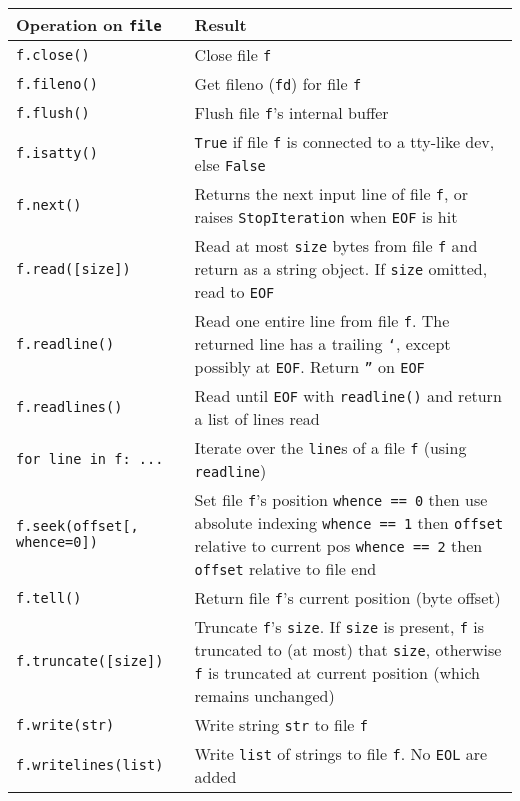 \label{tab:fichiers}
\begin{longtable}{|p{5cm}|p{10cm}|}
\hline
\bf Operation on {\tt file}	&	\bf Result \\
\hline
\hline
\tt f.close() 			& Close file {\tt f}\\
\tt f.fileno() 			& Get fileno ({\tt fd}) for file {\tt f}\\
\tt f.flush() 			& Flush file {\tt f}'s internal buffer\\
\tt f.isatty() 			& {\tt True} if file {\tt f} is connected to a tty-like dev, else {\tt False}\\
\hline
\tt f.next() 			& Returns the next input line of file {\tt f}, or raises {\tt StopIteration} when {\tt EOF} is hit\\
\tt f.read([size]) 		& Read at most {\tt size} bytes from file {\tt f} and return as a string object. If {\tt size} omitted, read to {\tt EOF}\\
\tt f.readline() 		& Read one entire line from file {\tt f}. The returned line has a trailing {\tt \char`\n}, except possibly at {\tt EOF}. Return {\tt ''} on {\tt EOF}\\
\tt f.readlines() 		& Read until {\tt EOF} with {\tt readline()} and return a list of lines read\\
\tt for line in f: ... 		& Iterate over the {\tt line}s of a file {\tt f} (using {\tt readline})\\
\hline
\tt f.seek(offset[, whence=0]) 	& Set file {\tt f}'s position\newline
				  {\tt whence == 0} then use absolute indexing\newline
				  {\tt whence == 1} then {\tt offset} relative to current pos\newline
				  {\tt whence == 2} then {\tt offset} relative to file end\\
\tt f.tell() 			& Return file {\tt f}'s current position (byte offset)\\
\tt f.truncate([size]) 		& Truncate {\tt f}'s {\tt size}. If {\tt size} is present, {\tt f} is truncated to (at most) that {\tt size}, 
				  otherwise {\tt f} is truncated at current position (which remains unchanged)\\
\hline
\tt f.write(str) 		& Write string {\tt str} to file {\tt f}\\
\tt f.writelines(list)  	& Write {\tt list} of strings to file {\tt f}. No {\tt EOL} are added\\
\hline
\end{longtable}

